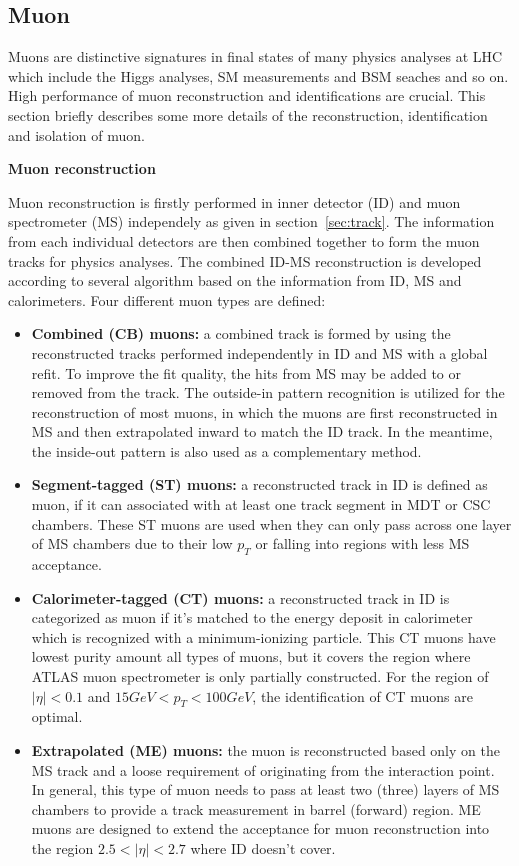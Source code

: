 \subsection{Muon}
\label{sec:muon}

Muons are distinctive signatures in final states of many physics analyses at LHC which include the Higgs analyses, SM measurements and BSM seaches and so on. 
High performance of muon reconstruction and identifications are crucial.
This section briefly describes some more details of the reconstruction, identification and isolation of muon.

\textbf{Muon reconstruction}

Muon reconstruction is firstly performed in inner detector (ID) and muon spectrometer (MS) independely as given in section~\ref{sec:track}.
The information from each individual detectors are then combined together to form the muon tracks for physics analyses.
The combined ID-MS reconstruction is developed according to several algorithm based on the information from ID, MS and calorimeters.
Four different muon types are defined\cite{Aad:2016jkr}:
\begin{itemize}
	\item \textbf{Combined (CB) muons:} a combined track is formed by using the reconstructed tracks performed independently in ID and MS with a global refit. To improve the fit quality, the hits from MS may be added to or removed from the track. The outside-in pattern recognition is utilized for the reconstruction of most muons, in which the muons are first reconstructed in MS and then extrapolated inward to match the ID track. In the meantime, the inside-out pattern is also used as a complementary method.
	\item \textbf{Segment-tagged (ST) muons:} a reconstructed track in ID is defined as muon, if it can associated with at least one track segment in MDT or CSC chambers. These ST muons are used when they can only pass across one layer of MS chambers due to their low $p_{T}$ or falling into regions with less MS acceptance.
	\item \textbf{Calorimeter-tagged (CT) muons:} a reconstructed track in ID is categorized as muon if it's matched to the energy deposit in calorimeter which is recognized with a minimum-ionizing particle. This CT muons have lowest purity amount all types of muons, but it covers the region where ATLAS muon spectrometer is only partially constructed. For the region of $|\eta| < 0.1$ and $15 GeV < p_{T} < 100 GeV$, the identification of CT muons are optimal.
	\item \textbf{Extrapolated (ME) muons:} the muon is reconstructed based only on the MS track and a loose requirement of originating from the interaction point. In general, this type of muon needs to pass at least two (three) layers of MS chambers to provide a track measurement in barrel (forward) region. ME muons are designed to extend the acceptance for muon reconstruction into the region $2.5 < |\eta| < 2.7$ where ID doesn't cover.
\end{itemize}

